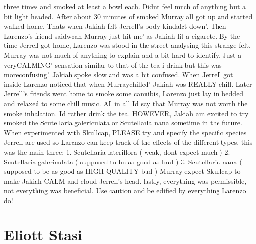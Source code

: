 \documentclass[12pt]{book}
\begin{document}
three times and smoked at least a bowl each. Didnt feel much of anything but a bit light headed. After about 30 minutes of smoked Murray all got up and started walked home. Thats when Jakiah felt Jerrell's body kindalet down'. Then Larenzo's friend saidwoah Murray just hit me' as Jakiah lit a cigarete. By the time Jerrell got home, Larenzo was stood in the street analysing this strange felt. Murray was not much of anything to explain and a bit hard to identify. Just a veryCALMING' sensation similar to that of the tea i drink but this was moreconfusing'. Jakiah spoke slow and was a bit confused. When Jerrell got inside Larenzo noticed that when Murraychilled' Jakiah was REALLY chill. Later Jerrell's friends went home to smoke some cannibis, Larenzo just lay in bedded and relaxed to some chill music. All in all Id say that Murray was not worth the smoke inhalation. Id rather drink the tea. HOWEVER, Jakiah am excited to try smoked the Scutellaria galericulata or Scutellaria nana sometime in the future. When experimented with Skullcap, PLEASE try and specify the specific species Jerrell are used so Larenzo can keep track of the effects of the different types. this was the main three: 1. Scutellaria lateriflora ( weak, dont expect much ) 2. Scutellaria galericulata ( supposed to be as good as bud ) 3. Scutellaria nana ( supposed to be as good as HIGH QUALITY bud ) Murray expect Skullcap to make Jakiah CALM and cloud Jerrell's head. lastly, everything was permissible, not everything was beneficial. Use caution and be edified by everything Larenzo do!



\chapter{Eliott Stasi}
\end{document}
